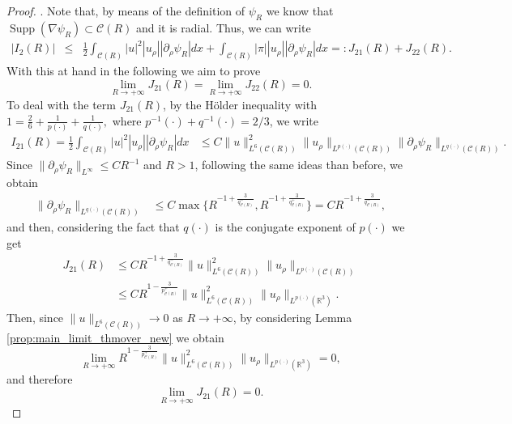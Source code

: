 \documentclass[a4paper,12pt]{amsart}
\theoremstyle{definition}
\theoremstyle{plain}
\def\R{\mathbb{R}}
\def\R{\mathbb R}
\def\vu{ u }
\def\vn{ \nabla }
\def\supp{\operatorname{Supp}}
\begin{document}
\begin{proof}
. 
 Note that, by means of  the definition of $\psi_R$ we know that $\supp( \vn \psi_R)\subset\mathcal{C}( R) $ {\color{black}and it is radial}. Thus, we can write 
{
\color{black}
\begin{eqnarray}
\left|I_2(R)\right|
& \leq &\frac{1}{2}  
\int_{\mathcal{C}( R) }|\vu|^2
| \vu_\rho |
| \partial_\rho\psi_R |
 dx 
+
 \int_{\mathcal{C}( R) } 
 |\pi |
 | \vu_\rho |
| \partial_\rho\psi_R |  
  dx 
=: J_{21}(R)+J_{22}(R)
.
\end{eqnarray}
}
With this at hand in the following we aim to prove 
$$
\displaystyle \lim_{R\to +\infty}J_{21}(R)= \lim_{R\to +\infty} J_{22}(R)=0.
$$
To deal with the term $J_{21}(R)$, by the H\"older inequality with 
$ 
1=\frac{2}{6}+\frac{1}{p(\cdot)} +\frac{1}{q(\cdot)},
$ 
where $p^{-1}(\cdot)+q^{-1}(\cdot)=2/3$, 
we write 
\begin{align}
I_{21}(R)= \frac{1}{2}  
\int_{\mathcal{C}( R) }|\vu|^2
| \vu_\rho |
| \partial_\rho\psi_R |
 dx 
&\leq   C
\|\vu \|_{L^{ 6 }(\mathcal{C}( R)  )}^2
\|u_\rho \|_{L^{ p (\cdot) }(\mathcal{C}( R) )}
\|\partial_\rho \psi_R \|_{L^{ q (\cdot) }(\mathcal{C}( R) )}
. 
\end{align}
Since $ \| \partial_\rho \psi_R   \|_{L^{\infty}}\leq CR^{-1}$ and $R>1$, following the same ideas than before, we obtain  
\begin{align}
\| \partial_\rho \psi_R   \|_{L^{q(\cdot)}(\mathcal{C}( R)  )}
&\leq
 C\max \{R^{-1+\frac 3{q_{\mathcal{C}( R)  }^-}}, R^{-1+\frac 3 {q_{\mathcal{C}( R)  }^+}}\} 
=
 C R^{-1+\frac 3{q_{\mathcal{C}( R)  }^-}}
 ,
  \label{EstimationBeta1C_92_exterior_bola}
\end{align}
and then, considering the fact that $q(\cdot)$ is the conjugate exponent of $p(\cdot)$ we get 
\begin{align}\label{estimateI21_92_exterior_bola}
J_{21}(R)
&\leq 
  C R^{-1+\frac 3{q_{\mathcal{C}( R)  }^-}}
\|\vu \|_{L^{ 6 }(\mathcal{C}( R)  )}^2
\|u_\rho \|_{L^{ p (\cdot) }(\mathcal{C}( R) )}
\\ &\leq 
  C R^{1-\frac 3{p_{\mathcal{C}( R)  }^+}}
\|\vu \|_{L^{ 6 }(\mathcal{C}( R)  )}^2
\|u_\rho \|_{L^{ p (\cdot) }(\R^3 )}
. 
\end{align}
Then, since  
$\|\vu\|_{L^{6}( \mathcal{C}( R)   )}\to 0$ as  $R\to +\infty$, by considering Lemma \ref{prop:main_limit_thmover_new} we obtain
$$\lim_{R\to +\infty} R^{1-\frac 3{p_{\mathcal{C}( R)  }^+}}
\|\vu \|_{L^{ 6 }(\mathcal{C}( R)  )}^2
\|u_\rho \|_{L^{ p (\cdot) }(\R^3 )}
= 0,$$
and therefore $$
\lim_{R\to +\infty} J_{21}(R) = 0.$$ 

\end{proof}
\end{document}
